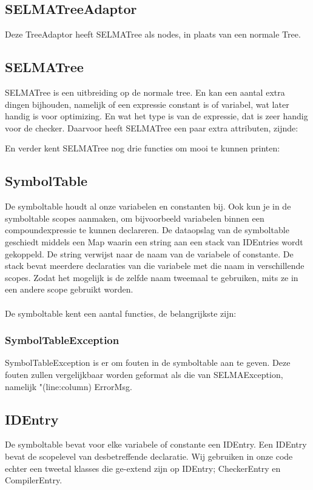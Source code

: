 \documentclass[]{article}
\begin{document}
\subsection{SELMATreeAdaptor}
Deze TreeAdaptor heeft SELMATree als nodes, in plaats van een normale Tree.

\subsection{SELMATree}
SELMATree is een uitbreiding op de normale tree. En kan een aantal extra dingen bijhouden, namelijk of een expressie constant is of variabel, wat later handig is voor optimizing. En wat het type is van de expressie, dat is zeer handig voor de checker.
Daarvoor heeft SELMATree een paar extra attributen, zijnde:

En verder kent SELMATree nog drie functies om mooi te kunnen printen:


\subsection{SymbolTable}
De symboltable houdt al onze variabelen en constanten bij. Ook kun je in de symboltable scopes aanmaken, om bijvoorbeeld variabelen binnen een compoundexpressie te kunnen declareren. De dataopslag van de symboltable geschiedt middels een Map waarin een string aan een stack van IDEntries wordt gekoppeld. De string verwijst naar de naam van de variabele of constante. De stack bevat meerdere declaraties van die variabele met die naam in verschillende scopes. Zodat het mogelijk is de zelfde naam tweemaal te gebruiken, mits ze in een andere scope gebruikt worden.\\
\\
De symboltable kent een aantal functies, de belangrijkste zijn:


\subsubsection{SymbolTableException}
SymbolTableException is er om fouten in de symboltable aan te geven. Deze fouten zullen vergelijkbaar worden geformat als die van SELMAException, namelijk "(line:column) ErrorMsg.

\subsection{IDEntry}
De symboltable bevat voor elke variabele of constante een IDEntry. Een IDEntry bevat de scopelevel van desbetreffende declaratie. Wij gebruiken in onze code echter een tweetal klasses die ge-extend zijn op IDEntry; CheckerEntry en CompilerEntry.
\end{document}
